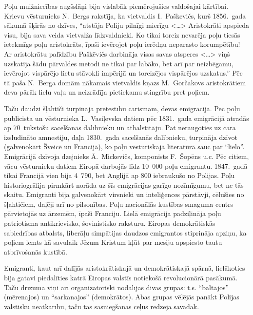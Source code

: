 \documentclass[twoside,a5paper,12pt,fleqn,openany]{extbook}
\newcommand{\citespace}{<\dots{}>}
\begin{document}
Poļu muižniecības augšslāņi bija vislabāk piemērojušies valdošajai kārtībai. Krievu vēsturnieks N.~Bergs rakstīja, ka vietvaldis I.~Paškevičs, kurš 1856.~gada sākumā šķīrās no dzīves, ``atstāja Poliju pilnīgi mierīgu \citespace{} Aristokrāti apspieda visu, bija sava veida vietvalža līdzvaldnieki. Ko tikai toreiz nevarēja poļu tiesās ietekmīgs poļu aristokrāts, īpaši ievērojot poļu ierēdņu neparasto korumpētību! Ar aristokrātu palīdzību Paškēvičs darbināja visas savas atsperes \citespace{} viņš uzskatīja šādu pārvaldes metodi ne tikai par labāko, bet arī par neizbēgamu, ievērojot vispārējo lietu stāvokli impērijā un toreizējos vispārējos uzskatus.'' Pēc tā paša N.~Berga domām nākamais vietvaldis kņazs M.~Gorčakovs aristokrātiem deva pārāk lielu vaļu un neizrādīja pietiekamu stingrību pret poļiem.

Taču daudzi šļahtiči turpināja pretestību carismam, devās emigrācijā. Pēc poļu publicista un vēsturnieka L.~Vasiļevska datiem pēc 1831.~gada emigrācijā atradās ap 70~tūkstošu sacelšanās dalībnieku un atbalstītāju. Pat neraugoties uz cara izsludināto amnestiju, daļa 1830.~gada sacelšanās dalībnieku, turpināja dzīvot  (galvenokārt Šveicē un Francijā), ko poļu vēsturiskajā literatūrā sauc par ``lielo''. Emigrācijā dzīvoja dzejnieks Ā.~Mickevičs, komponists F.~Šopēns u.c. Pēc citiem, vācu vēsturnieku datiem Eiropā darbojās līdz 10~000 poļu emigrantu. 1847.~gadā tikai Francijā vien bija 4~790, bet Anglijā ap 800 iebraukušo no Polijas. Poļu historiogrāfija pirmkārt norāda uz šīs emigrācijas garīgo nozīmīgumu, bet ne tās skaitu. Emigranti bija galvenokārt virsnieki un inteliģences pārstāvji, cēlušies no šļahtičiem, daļēji arī no pilsonības. Poļu nacionālās kustības smaguma centrs pārvietojās uz ārzemēm, īpaši Franciju. Lielā emigrācija padziļināja poļu patriotisma antikrievisko, šovinistisko raksturu. Eiropas demokrātiskās sabiedrības atbalsts, liberāļu simpātijas daudzos emigrantos stiprināja apziņu, ka poļiem lemts kā savulaik Jēzum Kristum kļūt par mesiju apspiesto tautu atbrīvošanās kustībā.

Emigranti, kaut arī dalījās aristokrātiskajā un demokrātiskajā spārnā, lielākoties bija gatavi piedalīties katrā Eiropas valstīs notiekošā revolucionārā pasākumā. Taču drīzumā viņi arī organizatoriski nodalījās divās grupās: t.s. ``baltajos'' (mērenajos) un ``sarkanajos'' (demokrātos). Abas grupas vēlējās panākt Polijas valstisku neatkarību, taču tās sasniegšanas ceļus redzēja savādāk.
\end{document}
